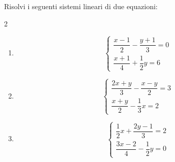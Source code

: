 \begin{question}[ID=2.5, subtitle={Sistemi con frazioni complesse}, difficulty=difficile, tags={sistemi, equazioni lineari, frazioni}]
Risolvi i seguenti sistemi lineari di due equazioni:
\begin{multicols}{2}
\begin{enumerate}[leftmargin=3.2cm]
    \item
    \[
    \begin{cases}
    \dfrac{x-1}{2}-\dfrac{y+1}{3}=0\\
    \dfrac{x+1}{4}+\dfrac{1}{2}y=6
    \end{cases}
    \]

    \item
    \[
    \begin{cases}
    \dfrac{2x+y}{3}-\dfrac{x-y}{2}=3\\
    \dfrac{x+y}{2}-\dfrac{1}{3}x=2
    \end{cases}
    \]

    \item
    \[
    \begin{cases}
    \dfrac{1}{2}x+\dfrac{2y-1}{3}=2\\
    \dfrac{3x-2}{4}-\dfrac{1}{2}y=0
    \end{cases}
    \]


\end{enumerate}
\end{multicols}
\end{question}
